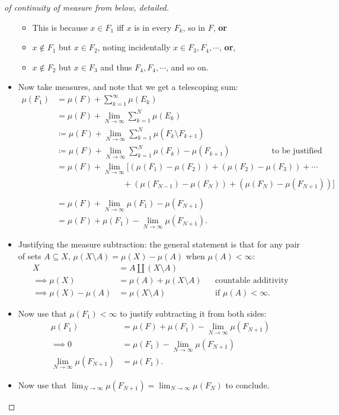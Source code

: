 \begin{proof}[of continuity of measure from below, detailed]
\begin{itemize}
  \begin{itemize}
  \tightlist
  \item
    This is because \(x\in F_1\) iff \(x\) is in every \(F_k\), so in
    \(F\), \textbf{or}
  \item
    \(x\not \in F_1\) but \(x\in F_2\), noting incidentally
    \(x\in F_3, F_4,\cdots\), \textbf{or},
  \item
    \(x\not\in F_2\) but \(x\in F_3\) and thus \(F_4, F_4,\cdots\), and
    so on.
  \end{itemize}
\item
  Now take measures, and note that we get a telescoping sum:
  \begin{align*}
  \mu(F_1) 
  &= \mu(F) + \sum_{k=1}^\infty \mu(E_k) \\
  &= \mu(F) + \lim_{N\to\infty} \sum_{k=1}^N \mu(E_k) \\
  &\coloneqq\mu(F) + \lim_{N\to\infty} \sum_{k=1}^N \mu(F_k \setminus F_{k+1} ) \\
  &\coloneqq\mu(F) + \lim_{N\to\infty} \sum_{k=1}^N \mu(F_k) - \mu(F_{k+1} ) \hspace{5em}\text{to be justified}\\
  &= \mu(F) + \lim_{N\to\infty} 
  [
  (\mu(F_1) - \mu(F_2)) +  
  (\mu(F_2) - \mu(F_3)) +  
  \cdots \\ 
  & \hspace{8em} + (\mu(F_{N-1}) - \mu(F_N)) +  
  (\mu(F_N) - \mu(F_{N+1})) 
  ] \\ \\
  &= \mu(F) + \lim_{N\to\infty} \mu(F_1) - \mu(F_{N+1}) \\
  &= \mu(F) + \mu(F_1) - \lim_{N\to\infty} \mu(F_{N+1})
  .\end{align*}
\item
  Justifying the measure subtraction: the general statement is that for
  any pair of sets \(A\subseteq X\),
  \(\mu(X\setminus A) = \mu(X) - \mu(A)\) when \(\mu(A) < \infty\):
  \begin{align*}
  X &= A {\textstyle\coprod}(X\setminus A) \\
  \implies \mu(X) &= \mu(A) + \mu(X\setminus A) && \text{countable additivity} \\
  \implies \mu(X) -\mu(A) &= \mu(X\setminus A) && \text{if } \mu(A) < \infty 
  .\end{align*}
\item
  Now use that \(\mu(F_1)<\infty\) to justify subtracting it from both
  sides:
  \begin{align*}
  \mu(F_1)
  &= \mu(F) + \mu(F_1) - \lim_{N\to\infty} \mu(F_{N+1}) \\
  \implies
  0
  &= \mu(F_1) - \lim_{N\to\infty} \mu(F_{N+1}) \\
  \lim_{N\to\infty} \mu(F_{N+1})
  &= \mu(F_1) 
  .\end{align*}
\item
  Now use that
  \(\lim_{N\to\infty}\mu(F_{N+1}) = \lim_{N\to\infty} \mu(F_N)\) to
  conclude.
\end{itemize}

\end{proof}

